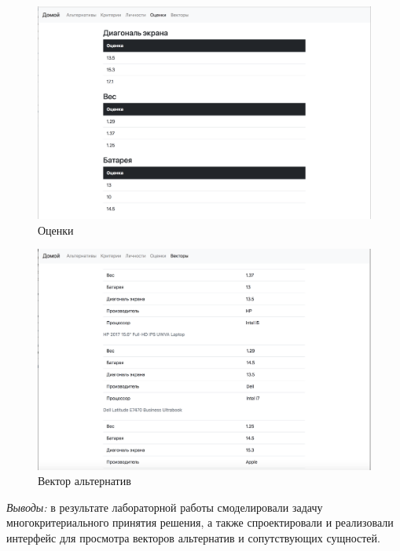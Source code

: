 \documentclass[titlepage]{article}
\newcommand{\conclustions}[1]{\textit{Выводы:} #1}
\begin{document}
\begin{figure}
\includegraphics[scale=0.4]{marks}
\caption{Оценки}
\label{fig:marks}
\end{figure}

\begin{figure}
\includegraphics[scale=0.4]{vectors}
\caption{Вектор альтернатив}
\label{fig:vectors}
\end{figure}


\conclustions{в результате лабораторной работы смоделировали задачу многокритериального принятия решения, а также спроектировали и реализовали интерфейс для просмотра векторов альтернатив и сопутствующих сущностей.}
\end{document}
